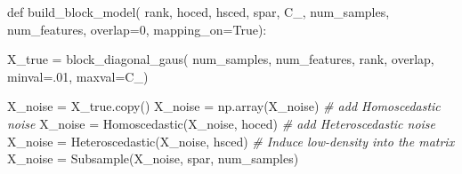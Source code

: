 \documentclass[
]{article}
\newenvironment{Shaded}{}{}
\newcommand{\CommentTok}[1]{\textcolor[rgb]{0.63,0.63,0.65}{\textit{#1}}}
\newcommand{\DecValTok}[1]{\textcolor[rgb]{0.60,0.41,0.00}{#1}}
\newcommand{\FloatTok}[1]{\textcolor[rgb]{0.60,0.41,0.00}{#1}}
\newcommand{\KeywordTok}[1]{\textcolor[rgb]{0.65,0.15,0.64}{#1}}
\newcommand{\NormalTok}[1]{\textcolor[rgb]{0.22,0.23,0.26}{#1}}
\newcommand{\OperatorTok}[1]{\textcolor[rgb]{0.65,0.15,0.64}{#1}}
\newcommand{\VariableTok}[1]{\textcolor[rgb]{0.89,0.34,0.29}{#1}}
\begin{document}
\begin{Shaded}
\begin{Highlighting}[numbers=left,,firstnumber=175,]
\KeywordTok{def}\NormalTok{ build\_block\_model(}
\NormalTok{        rank,}
\NormalTok{        hoced,}
\NormalTok{        hsced,}
\NormalTok{        spar,}
\NormalTok{        C\_,}
\NormalTok{        num\_samples,}
\NormalTok{        num\_features,}
\NormalTok{        overlap}\OperatorTok{=}\DecValTok{0}\NormalTok{,}
\NormalTok{        mapping\_on}\OperatorTok{=}\VariableTok{True}\NormalTok{):}
\end{Highlighting}
\end{Shaded}

\normalsize{}

\footnotesize

\begin{Shaded}
\begin{Highlighting}[numbers=left,,firstnumber=237,]
\NormalTok{    X\_true }\OperatorTok{=}\NormalTok{ block\_diagonal\_gaus(}
\NormalTok{      num\_samples,}
\NormalTok{      num\_features,}
\NormalTok{      rank,}
\NormalTok{      overlap,}
\NormalTok{      minval}\OperatorTok{=}\FloatTok{.01}\NormalTok{,}
\NormalTok{      maxval}\OperatorTok{=}\NormalTok{C\_)}
\end{Highlighting}
\end{Shaded}

\normalsize{}

\footnotesize

\begin{Shaded}
\begin{Highlighting}[numbers=left,,firstnumber=254,]
\NormalTok{    X\_noise }\OperatorTok{=}\NormalTok{ X\_true.copy()}
\NormalTok{    X\_noise }\OperatorTok{=}\NormalTok{ np.array(X\_noise)}
    \CommentTok{\# add Homoscedastic noise}
\NormalTok{    X\_noise }\OperatorTok{=}\NormalTok{ Homoscedastic(X\_noise, hoced)}
    \CommentTok{\# add Heteroscedastic noise}
\NormalTok{    X\_noise }\OperatorTok{=}\NormalTok{ Heteroscedastic(X\_noise, hsced)}
    \CommentTok{\# Induce low{-}density into the matrix}
\NormalTok{    X\_noise }\OperatorTok{=}\NormalTok{ Subsample(X\_noise, spar, num\_samples)}
\end{Highlighting}
\end{Shaded}

\normalsize{}
\end{document}
